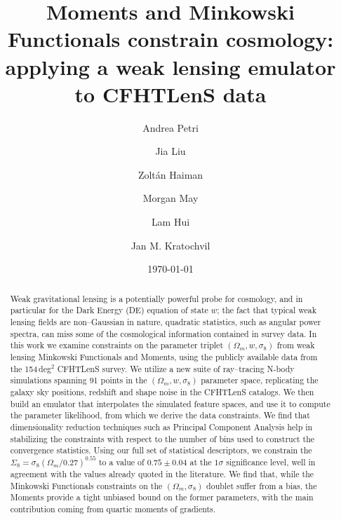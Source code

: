 \documentclass[reprint,aps,prd,superscriptaddress,showkeys,showpacs]{revtex4-1}
\begin{document}
\title{Moments and Minkowski Functionals constrain cosmology: applying a weak lensing emulator to CFHTLenS data}

\author{Andrea Petri}

\author{Jia Liu}

\author{Zolt\'an Haiman}

\author{Morgan May}

\author{Lam Hui}

\author{Jan M. Kratochvil}

\date{\today}

\label{firstpage}

\begin{abstract}
Weak gravitational lensing is a potentially powerful probe for cosmology, and in particular for the Dark Energy (DE) equation of state $w$; the fact that typical weak lensing fields are non--Gaussian in nature, quadratic statistics, such as angular power spectra, can miss some of the cosmological information contained in survey data. In this work we examine constraints on the parameter triplet $(\Omega_m,w,\sigma_8)$ from weak lensing Minkowski Functionals and Moments, using the publicly available data from the 154\,deg$^2$ CFHTLenS survey. We utilize a new suite of ray--tracing N-body simulations spanning 91 points in the $(\Omega_m,w,\sigma_8)$ parameter space, replicating the galaxy sky positions, redshift and shape noise in the CFHTLenS catalogs. We then build an emulator that interpolates the simulated feature spaces, and use it to compute the parameter likelihood, from which we derive the data constraints. We find that dimensionality reduction techniques such as Principal Component Analysis help in stabilizing the constraints with respect to the number of bins used to construct the convergence statistics. Using our full set of statistical descriptors, we constrain the $\Sigma_8=\sigma_8(\Omega_m/0.27)^{0.55}$ to a value of $0.75\pm0.04$ at the $1\sigma$ significance level, well in agreement with the values already quoted in the literature. We find that, while the Minkowski Functionals constraints on the $(\Omega_m,\sigma_8)$ doublet suffer from a bias, the Moments provide a tight unbiased bound on the former parameters, with the main contribution coming from quartic moments of gradients.  

\end{abstract}
\end{document}
